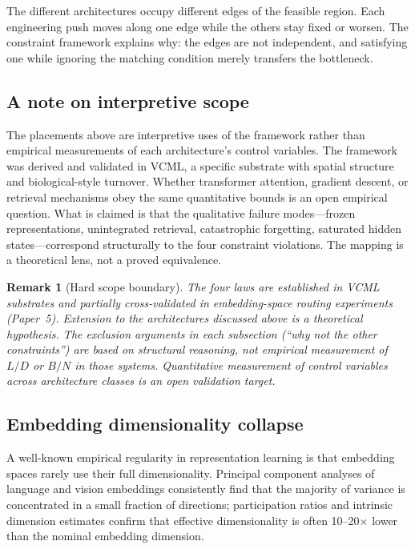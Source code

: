 \documentclass[12pt]{article}
\newtheorem{remark}{Remark}
\begin{document}
The different architectures occupy different edges of the feasible region. Each engineering push moves along one edge while the others stay fixed or worsen. The constraint framework explains why: the edges are not independent, and satisfying one while ignoring the matching condition merely transfers the bottleneck.

\subsection{A note on interpretive scope}

The placements above are interpretive uses of the framework rather than empirical measurements of each architecture's control variables. The framework was derived and validated in VCML, a specific substrate with spatial structure and biological-style turnover. Whether transformer attention, gradient descent, or retrieval mechanisms obey the same quantitative bounds is an open empirical question. What is claimed is that the qualitative failure modes---frozen representations, unintegrated retrieval, catastrophic forgetting, saturated hidden states---correspond structurally to the four constraint violations. The mapping is a theoretical lens, not a proved equivalence.

\begin{remark}[Hard scope boundary]
The four laws are established in VCML substrates and partially cross-validated in embedding-space routing experiments (Paper~5). Extension to the architectures discussed above is a theoretical hypothesis. The exclusion arguments in each subsection (``why not the other constraints'') are based on structural reasoning, not empirical measurement of $L/D$ or $B/N$ in those systems. Quantitative measurement of control variables across architecture classes is an open validation target.
\end{remark}

\subsection{Embedding dimensionality collapse}

A well-known empirical regularity in representation learning is that embedding spaces rarely use their full dimensionality. Principal component analyses of language and vision embeddings consistently find that the majority of variance is concentrated in a small fraction of directions; participation ratios and intrinsic dimension estimates confirm that effective dimensionality is often 10--20$\times$ lower than the nominal embedding dimension.
\end{document}
